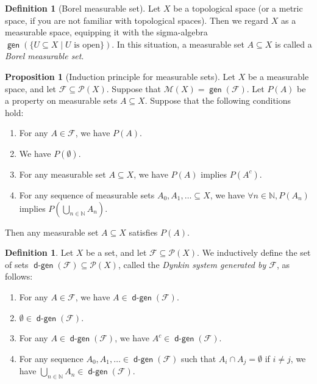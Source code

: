 \documentclass{article}
\theoremstyle{definition}
\newtheorem{proposition}[theorem]{Proposition}
\newtheorem{definition}[theorem]{Definition}
\DeclareMathOperator{\gen}{\mathsf{gen}}
\DeclareMathOperator{\dgen}{\mathsf{d-gen}}
\begin{document}
\begin{definition}[Borel measurable set]
  Let $X$ be a topological space (or a metric space, if you are not familiar with topological spaces).
  Then we regard $X$ as a measurable space,
  equipping it with the sigma-algebra
  $\gen (\{U \subseteq X \mid \text{$U$ is open}\})$.
  In this situation, a measurable set $A \subseteq X$ 
  is called a \emph{Borel measurable set}.
\end{definition}

\begin{proposition}[Induction principle for measurable sets]
  Let $X$ be a measurable space, 
  and let $\mathcal{F} \subseteq \mathcal{P}(X)$.
  Suppose that $\mathcal{M}(X) = \gen (\mathcal{F})$.
  Let $P(A)$ be a property on measurable sets $A \subseteq X$.
  Suppose that the following conditions hold:
  \begin{enumerate}
    \item For any $A \in \mathcal{F}$, we have $P(A)$.
    \item We have $P(\emptyset)$.
    \item For any measurable set $A \subseteq X$, we have $P(A)$ implies $P(A^c)$.
    \item For any sequence of measurable sets $A_0, A_1, \dots \subseteq X$,
      we have $\forall n \in \mathbb{N}, P(A_n)$ implies $P\left(\bigcup_{n \in \mathbb{N}} A_n\right)$.  
  \end{enumerate}
  Then any measurable set $A \subseteq X$ satisfies $P(A)$.
\end{proposition}

\begin{definition}
  Let $X$ be a set, and let $\mathcal{F} \subseteq \mathcal{P}(X)$.
  We inductively define the set of sets $\dgen (\mathcal{F}) \subseteq \mathcal{P}(X)$,
  called the \emph{Dynkin system generated by $\mathcal{F}$},
  as follows:
  \begin{enumerate}
    \item For any $A \in \mathcal{F}$, we have $A \in \dgen (\mathcal{F})$.
    \item $\emptyset \in \dgen (\mathcal{F})$.
    \item For any $A \in \dgen (\mathcal{F})$, we have $A^c \in \dgen (\mathcal{F})$.
    \item For any sequence $A_0, A_1, \dots \in \dgen (\mathcal{F})$ such that $A_i \cap A_j = \emptyset$ if $i \neq j$,
      we have $\bigcup_{n \in \mathbb{N}} A_n \in \dgen (\mathcal{F})$.
  \end{enumerate}
\end{definition}
\end{document}
